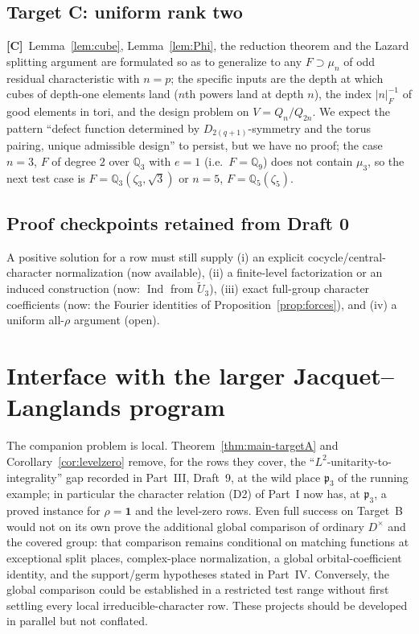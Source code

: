 \documentclass[11pt]{article}
\newcommand{\Q}{\mathbb Q}
\newcommand{\Ind}{\operatorname{Ind}}
\newcommand{\tU}{\widetilde U}
\newcommand{\pfr}{\mathfrak p}
\newcommand{\Ctag}{\textnormal{\textbf{[C]}}}
\theoremstyle{plain}
\theoremstyle{definition}
\begin{document}
\subsection{Target C: uniform rank two}\label{subsec:targetC}
\Ctag\ Lemma~\ref{lem:cube}, Lemma~\ref{lem:Phi}, the reduction theorem
and the Lazard splitting argument are formulated so as to generalize
to any $F\supset\mu_n$ of odd residual characteristic with $n=p$;
the specific inputs are the depth at which cubes of depth-one
elements land ($n$th powers land at depth $n$), the index
$|n|_F^{-1}$ of good elements in tori, and the design problem on
$V=Q_n/Q_{2n}$.  We expect the pattern ``defect function determined by
$D_{2(q+1)}$-symmetry and the torus pairing, unique admissible design''
to persist, but we have no proof; the case $n=3$, $F$ of degree $2$
over $\Q_3$ with $e=1$ (i.e.\ $F=\Q_9$) does not contain $\mu_3$, so the
next test case is $F=\Q_3(\zeta_3,\sqrt{3})$ or $n=5$, $F=\Q_5(\zeta_5)$.
\subsection{Proof checkpoints retained from Draft 0}
A positive solution for a row must still supply (i) an explicit
cocycle/central-character normalization (now available), (ii) a
finite-level factorization or an induced construction (now: $\Ind$
from $\tU_3$), (iii) exact full-group character coefficients (now: the
Fourier identities of Proposition~\ref{prop:forces}), and (iv) a
uniform all-$\rho$ argument (open).

\section{Interface with the larger Jacquet--Langlands program}
The companion problem is local.  Theorem~\ref{thm:main-targetA} and
Corollary~\ref{cor:levelzero} remove, for the rows they cover, the
``$L^2$-unitarity-to-integrality'' gap recorded in Part~III, Draft~9,
at the wild place $\pfr_3$ of the running example; in particular the
character relation (D2) of Part~I now has, at $\pfr_3$, a proved
instance for $\rho=\mathbf1$ and the level-zero rows.  Even full
success on Target~B would not on its own prove the additional global
comparison of ordinary $D^\times$ and the covered group: that comparison
remains conditional on matching functions at exceptional split places,
complex-place normalization, a global orbital-coefficient identity,
and the support/germ hypotheses stated in Part~IV.  Conversely, the
global comparison could be established in a restricted test range
without first settling every local irreducible-character row.  These
projects should be developed in parallel but not conflated.
\end{document}

